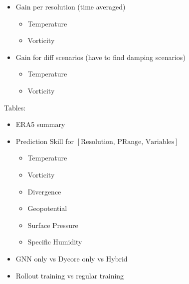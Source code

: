 \begin{itemize}
\begin{itemize}
            \item Specific Humidity
        \end{itemize}
    \item Gain per resolution (time averaged)
    \begin{itemize}
        \item Temperature
        \item Vorticity
    \end{itemize} 
    \item
    Gain for diff scenarios (have to find damping scenarios)
    \begin{itemize}
        \item Temperature
        \item Vorticity
    \end{itemize}
\end{itemize}

Tables:
\begin{itemize}
    \item ERA5 summary
    \item Prediction Skill for $[\text{Resolution, PRange, Variables}]$
        \begin{itemize}
            \item Temperature
            \item Vorticity
            \item Divergence
            \item Geopotential
            \item Surface Pressure
            \item Specific Humidity
        \end{itemize}
    \item GNN only vs Dycore only vs Hybrid
    \item Rollout training vs regular training
\end{itemize}

